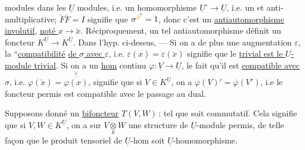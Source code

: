 modules dans les $\underline U$ modules, i.e. un
 homomorphisme $\underline U^\circ\longrightarrow\underline U$, i.e.
un 
et anti-multiplicative; $\breve F\breve F=I$ signifie
que $\sigma^{\unsure{2}}=1$, donc c'est un \uline{antiautomorphisme involutif}, \uline{noté $x\longrightarrow\breve x$}. Réciproquement,
un tel antiautomorphisme définit
 un foncteur $K^{\underline U}\longrightarrow K^{\underline U}$. Dans l'hyp. ci-dessus,  --- Si on a de
plus une augmentation $\varepsilon$, la ``\uline{compatibilité}
\uline{de $\sigma$ avec $\varepsilon$}, i.e. $\varepsilon(x)=\varepsilon(\breve x)$
signifie que le 
\uline{trivial est le $U$-module trivial}.  Si
on a un \uline{hom} continu $\varphi:\underline V\longrightarrow\underline U$, le
fait qu'il est \uline{compatible avec $\sigma$},
i.e. $\varphi(\breve x)=\overset{\vee}{\overline{\varphi(x)}}$, signifie que
  si $V\in K^{\underline U}$, on a
$\overline\varphi(V)'=\overline\varphi(V')$, i.e le foncteur
permis est compatible avec le
passage au dual.

Supposons donné un \uline{bifoncteur}
$T(V,W)$\,: \hfill tel que
soit commutatif. Cela signifie que si $V,W\in K^{\underline U}$,
on a sur $V\underset{k}{\otimes}W$ une structure de
$\underline U$-module permis, de telle façon que
le produit tensoriel de $\underline U$-hom soit
 $\underline U$-homomorphisme.

